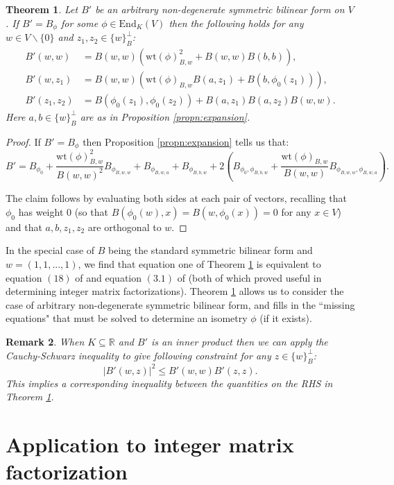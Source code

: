 \documentclass{amsart}
\theoremstyle{plain}
\newtheorem{theorem}{Theorem}[section]
\newtheorem{remark}[theorem]{Remark}
\theoremstyle{definition}
\begin{document}
\begin{theorem}
\label{thm:wt}
Let $B'$ be an arbitrary non-degenerate symmetric bilinear form on $V$. If $B' = B_{\phi}$ for some $\phi\in\text{End}_K(V)$ then the following holds for any $w\in V\backslash\{0\}$ and $z_1, z_2\in\{w\}_B^{\perp}$:
\begin{align*}
    B'(w,w) &= B(w,w)(\text{wt}(\phi)_{B,w}^2 + B(w,w)B(b,b)),\\
    B'(w,z_1) &= B(w,w)(\text{wt}(\phi)_{B,w}B(a,z_1)+B(b,\phi_0(z_1))),\\
    B'(z_1,z_2) &= B(\phi_0(z_1), \phi_0(z_2)) + B(a,z_1)B(a,z_2)B(w,w).
\end{align*}
Here $a,b\in\{w\}_B^{\perp}$ are as in Proposition \ref{propn:expansion}.
\end{theorem}
\begin{proof}
If $B' = B_{\phi}$ then Proposition \ref{propn:expansion} tells us that: \[B' = B_{\phi_0} + \frac{\text{wt}(\phi)_{B,w}^2}{B(w,w)^2} B_{\phi_{B,w,w}} + B_{
\phi_{B,w,a}} + B_{\phi_{B,b,w}} + 2\left(B_{\phi_0,\phi_{B,b,w}} + \frac{\text{wt}(\phi)_{B,w}}{B(w,w)}B_{\phi_{B,w,w},\phi_{B,w,a}}\right).\]

The claim follows by evaluating both sides at each pair of vectors, recalling that $\phi_0$ has weight $0$ (so that $B(\phi_0(w),x) = B(w,\phi_0(x)) = 0$ for any $x\in V$) and that $a,b, z_1, z_2$ are orthogonal to $w$.
\end{proof}

In the special case of $B$ being the standard symmetric bilinear form and $w=(1,1,...,1)$, we find that equation one of Theorem \ref{thm:wt} is equivalent to equation $(18)$ of \cite{lettington} and equation $(3.1)$ of \cite{higham} (both of which proved useful in determining integer matrix factorizations). Theorem \ref{thm:wt} allows us to consider the case of arbitrary non-degenerate symmetric bilinear form, and fills in the ``missing equations" that must be solved to determine an isometry $\phi$ (if it exists).

\begin{remark}
    When $K\subseteq \mathbb{R}$ and $B'$ is an inner product then we can apply the Cauchy-Schwarz inequality to give following constraint for any $z\in\{w\}_B^{\perp}$:
    \[|B'(w,z)|^2 \leq B'(w,w)B'(z,z).\] This implies a corresponding inequality between the quantities on the RHS in Theorem \ref{thm:wt}.
\end{remark}

\section{Application to integer matrix factorization}
\end{document}
